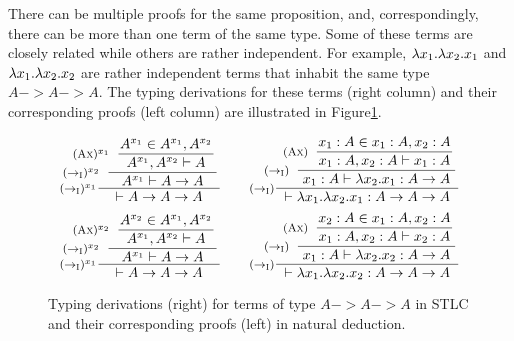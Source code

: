 There can be multiple proofs for the same proposition, and,
correspondingly, there can be more than one term of the same type.
Some of these terms are closely related while others are rather independent.
For example, $\lambda x_1.\lambda x_2.x_1$ and $\lambda x_1.\lambda x_2.x_2$ are rather 
independent terms that inhabit the same type $A -> A -> A$.
The typing derivations for these terms (right column) and
their corresponding proofs (left column) are illustrated in
Figure\;\ref{fig:proofAAA}.
\begin{figure}
\[\setpremisesend{.1em}
\inference[$(->_\textsc{I})^{x_1}$]
        {\hspace*{-3em}
         \inference[$(->_\textsc{I})^{x_2}$]
                {\hspace*{-3em}
                 \inference[$(\textsc{Ax})^{x_1}$]
                        {A^{x_1}\in A^{x_1},A^{x_2}}
                        {A^{x_1},A^{x_2} |- A} }
                {A^{x_1} |- A -> A} }
        {|- A -> A -> A }
\qquad
\inference[($->_\textsc{I}$)]
        {\hspace*{-1.3em}
         \inference[($->_\textsc{I}$)]
                {\hspace*{-1.5em}
                 \inference[(\textsc{Ax})]
                        {x_1 : A \in x_1 : A, x_2 : A}
                        {x_1 : A, x_2 : A |- x_1 : A} }
                {x_1 : A |- \l x_2.x_1 : A -> A} }
        {|- \l x_1.\l x_2.x_1 : A -> A -> A }
\]
\[\setpremisesend{.1em}
\inference[$(->_\textsc{I})^{x_1}$]
        {\hspace*{-3em}
         \inference[$(->_\textsc{I})^{x_2}$]
                {\hspace*{-3em}
                 \inference[$(\textsc{Ax})^{x_2}$]
                        {A^{x_2}\in A^{x_1},A^{x_2}}
                        {A^{x_1},A^{x_2} |- A} }
                {A^{x_1} |- A -> A} }
        {|- A -> A -> A }
\qquad
\inference[($->_\textsc{I}$)]
        {\hspace*{-1.3em}
         \inference[($->_\textsc{I}$)]
                {\hspace*{-1.5em}
                 \inference[(\textsc{Ax})]
                        {x_2 : A \in x_1 : A, x_2 : A}
                        {x_1 : A, x_2 : A |- x_2 : A} }
                {x_1 : A |- \l x_2.x_2 : A -> A} }
        {|- \l x_1.\l x_2.x_2 : A -> A -> A }
\]
\caption{Typing derivations (right) for terms of type $A -> A -> A$
	 in STLC and their corresponding proofs (left) in natural deduction.}
\label{fig:proofAAA}
\end{figure}

